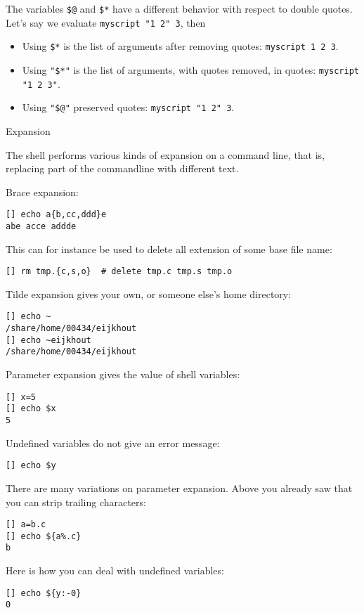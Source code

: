 The variables \verb+$@+ and \verb+$*+ have a different behavior with
respect to double quotes. Let's say we evaluate
\verb+myscript "1 2" 3+, then
\begin{itemize}
\item Using \verb+$*+ is the list of arguments after removing quotes:
  \verb+myscript 1 2 3+.
\item Using
  \verb+"$*"+ is the list of arguments, with quotes removed, in quotes:
  \verb+myscript "1 2 3"+.
\item Using
  \verb+"$@"+ preserved quotes:
  \verb+myscript "1 2" 3+.
\end{itemize}

 {Expansion}
\label{tut:unix-expansion}

The shell performs various kinds of expansion on a command line, that
is, replacing part of the commandline with different text.

Brace expansion:
\begin{lstlisting}
[] echo a{b,cc,ddd}e
abe acce addde
\end{lstlisting}
This can for instance be used to delete all extension of some base
file name:
\begin{lstlisting}
[] rm tmp.{c,s,o}  # delete tmp.c tmp.s tmp.o
\end{lstlisting}

Tilde expansion gives your own, or someone else's home directory:
\begin{lstlisting}
[] echo ~
/share/home/00434/eijkhout
[] echo ~eijkhout
/share/home/00434/eijkhout
\end{lstlisting}

Parameter expansion gives the value of shell variables:
\begin{lstlisting}
[] x=5
[] echo $x
5
\end{lstlisting}
Undefined variables do not give an error message:
\begin{lstlisting}
[] echo $y
\end{lstlisting}
There are many variations on parameter expansion. Above you already
saw that you can strip trailing characters:
\begin{lstlisting}
[] a=b.c
[] echo ${a%.c}
b
\end{lstlisting}
Here is how you can deal with undefined variables:
\begin{lstlisting}
[] echo ${y:-0}
0
\end{lstlisting}

\begin{comment}
There are ways of doing pattern matching and substitution 
on a variable:
\begin{lstlisting}
[] f=x.fort
[] echo ${f%%.fort}
x
[] echo ${f%%.fort}.bak
x.bak
\end{lstlisting}
\end{comment}

